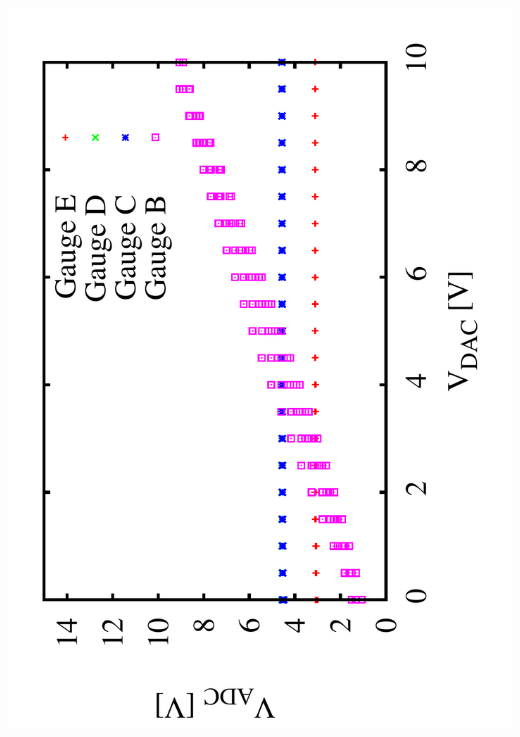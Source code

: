 \documentclass[a4paper,11pt]{book}
\begin{document}
 \includegraphics[angle=-90,scale=0.20]{image_ai_04.pdf}\\ 

 
\end{document}
